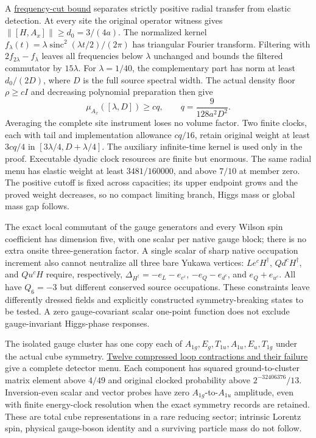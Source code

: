 A \href{https://github.com/FloatingPragma/observer-patch-holography/blob/main/model/particle_candidate_scalar_spectrum/PROOF.md}{frequency-cut bound}
separates strictly positive radial transfer from elastic detection. At every
site the original operator witness gives
$\|[H,A_x]\|\ge d_0=3/(4a)$. The normalized kernel
$f_\lambda(t)=\lambda\operatorname{sinc}^2(\lambda t/2)/(2\pi)$ has
triangular Fourier transform. Filtering with $2f_{2\lambda}-f_\lambda$
leaves all frequencies below $\lambda$ unchanged and bounds the filtered
commutator by $15\lambda$. For $\lambda=1/40$, the complementary part has
norm at least $d_0/(2D)$, where $D$ is the full source spectral width.
The actual density floor $\rho\ge cI$ and decreasing polynomial preparation
then give
\[
 \mu_{A_x}([\lambda,D])\ge cq,\qquad
 q=\frac{9}{128a^2D^2}.
\]
Averaging the complete site instrument loses no volume factor. Two finite
clocks, each with tail and implementation allowance $cq/16$, retain
original weight at least $3cq/4$ in
$[3\lambda/4,D+\lambda/4]$. The auxiliary infinite-time kernel is used
only in the proof. Executable dyadic clock resources are finite but enormous.
The same radial menu has elastic weight at least $3481/160000$, and above
$7/10$ at member zero. The positive cutoff is fixed across capacities;
its upper endpoint grows and the proved weight decreases, so no compact
limiting branch, Higgs mass or global mass gap follows.

The exact local commutant of the gauge generators and every Wilson spin
coefficient has dimension five, with one scalar per native gauge block;
there is no extra onsite three-generation factor. A single scalar of
sharp native occupation increment also cannot neutralize all three bare
Yukawa vertices: $Le^cH^\dagger$, $Qd^cH^\dagger$, and $Qu^cH$ require,
respectively, $\Delta_{H^\dagger}=-e_L-e_{e^c}$,
$-e_Q-e_{d^c}$, and $e_Q+e_{u^c}$. All have $Q_6=-3$ but different
conserved source occupations. These constraints leave differently dressed
fields and explicitly constructed symmetry-breaking states to be tested.
A zero gauge-covariant scalar one-point function does not exclude
gauge-invariant Higgs-phase responses.

The isolated gauge cluster has one copy each of
$A_{1g},E_g,T_{1u},A_{1u},E_u,T_{1g}$ under the actual cube symmetry.
\href{https://github.com/FloatingPragma/observer-patch-holography/blob/main/model/particle_candidate_bosons/PROOF.md}{Twelve compressed loop contractions and their failure}
give a complete detector menu. Each component has squared ground-to-cluster
matrix element above $4/49$ and original clocked probability above
$2^{-32406376}/13$. Inversion-even scalar and vector probes have zero
$A_{1g}$-to-$A_{1u}$ amplitude, even with finite energy-clock resolution
when the exact symmetry records are retained. These are total cube
representations in a rare reducing sector; intrinsic Lorentz spin,
physical gauge-boson identity and a surviving particle mass do not follow.

